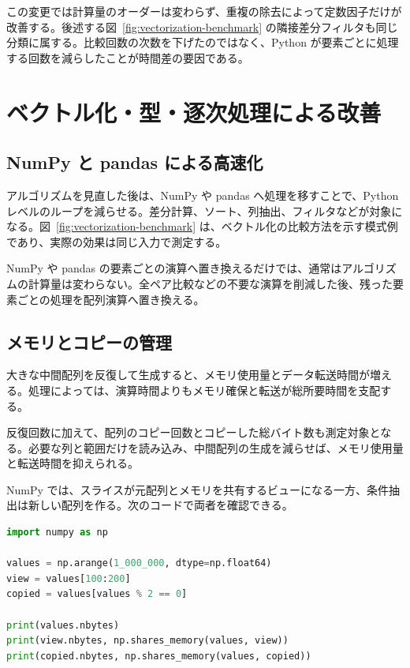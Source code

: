 この変更では計算量のオーダーは変わらず、重複の除去によって定数因子だけが改善する。後述する図~\ref{fig:vectorization-benchmark} の隣接差分フィルタも同じ分類に属する。比較回数の次数を下げたのではなく、Python が要素ごとに処理する回数を減らしたことが時間差の要因である。

\section{ベクトル化・型・逐次処理による改善}

\subsection{NumPy と pandas による高速化}

アルゴリズムを見直した後は、NumPy や pandas へ処理を移すことで、Python レベルのループを減らせる。差分計算、ソート、列抽出、フィルタなどが対象になる。図~\ref{fig:vectorization-benchmark} は、ベクトル化の比較方法を示す模式例であり、実際の効果は同じ入力で測定する。

NumPy や pandas の要素ごとの演算へ置き換えるだけでは、通常はアルゴリズムの計算量は変わらない。全ペア比較などの不要な演算を削減した後、残った要素ごとの処理を配列演算へ置き換える。

\subsection{メモリとコピーの管理}
\label{sec:performance-memory}

大きな中間配列を反復して生成すると、メモリ使用量とデータ転送時間が増える。処理によっては、演算時間よりもメモリ確保と転送が総所要時間を支配する。

反復回数に加えて、配列のコピー回数とコピーした総バイト数も測定対象となる。必要な列と範囲だけを読み込み、中間配列の生成を減らせば、メモリ使用量と転送時間を抑えられる。

NumPy では、スライスが元配列とメモリを共有するビューになる一方、条件抽出は新しい配列を作る。次のコードで両者を確認できる。

\begin{lstlisting}[language=Python]
import numpy as np

values = np.arange(1_000_000, dtype=np.float64)
view = values[100:200]
copied = values[values % 2 == 0]

print(values.nbytes)
print(view.nbytes, np.shares_memory(values, view))
print(copied.nbytes, np.shares_memory(values, copied))
\end{lstlisting}

